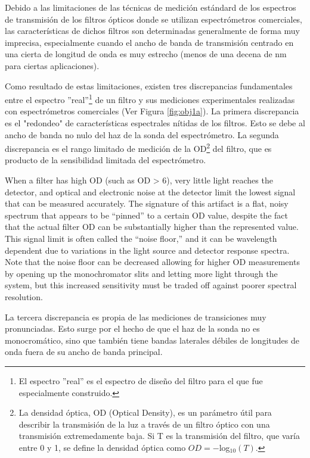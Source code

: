 \documentclass{ctuthesis}
\begin{document}
\hspace{0.5cm}Debido a las limitaciones de las técnicas de medición estándard 
de los espectros de transmisión de los filtros ópticos donde se utilizan 
espectrómetros comerciales, las características de dichos 
filtros son determinadas generalmente de forma muy imprecisa, especialmente 
cuando el ancho de banda de transmisión centrado en una cierta de longitud de 
onda es muy estrecho (menos de una decena de nm para ciertas aplicaciones).


Como resultado de estas limitaciones, existen tres discrepancias fundamentales 
entre el espectro ''real''\footnote{El espectro ''real'' es 
el espectro de diseño del filtro para el que fue especialmente construido.} de 
un 
filtro y sus mediciones experimentales realizadas con 
espectrómetros comerciales (Ver Figura \ref{fig:obj1a})\cite{Semrock}. La 
primera discrepancia es el "redondeo" de características espectrales nítidas de 
los filtros. 
Esto se debe al ancho de banda no nulo del haz de la sonda del 
espectrómetro. La segunda discrepancia es el rango limitado de 
medición de la OD\footnote{La densidad óptica, OD (Optical Density), es un 
parámetro útil para describir la transmisión de la luz a través de un filtro 
óptico con una transmisión extremedamente baja. Si T es la transmisión del 
filtro, que varía entre 0 y 1, se define la densidad óptica como $OD = 
-$log$_{10} (T)$.} del filtro, que es 
	producto de la sensibilidad limitada del espectrómetro. 
	
	When a filter has high OD (such as OD > 6), very little light reaches the
	detector, and optical and electronic noise at the detector limit the lowest 
	signal that can be
	measured accurately. The signature of this artifact is a flat, noisy 
	spectrum that appears to be
	“pinned” to a certain OD value, despite the fact that the actual filter OD 
	can be substantially
	higher than the represented value. This signal limit is often called the 
	“noise floor,” and it can be
	wavelength dependent due to variations in the light source and detector 
	response spectra. Note
	that the noise floor can be decreased allowing for higher OD measurements 
	by opening up the
	monochromator slits and letting more light through the system, but this 
	increased sensitivity
	must be traded off against poorer spectral resolution.
	
	
	La tercera 
	discrepancia es propia de las mediciones de transiciones muy 
	pronunciadas. Esto surge 
	por el hecho de que el 
	haz de la sonda no es monocromático, sino que también tiene bandas 
	laterales débiles de longitudes de onda fuera de su ancho de banda 
	principal.
\end{document}
